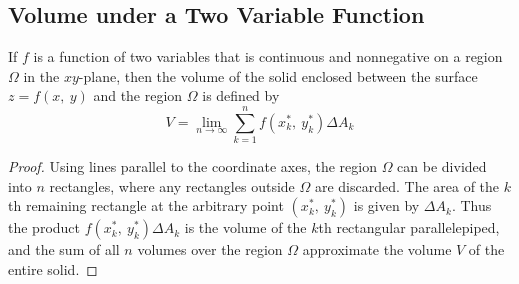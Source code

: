 \documentclass{article}
\begin{document}
\subsection{Volume under a Two Variable Function}
\begin{definition}
    If $f$ is a function of two variables that is continuous and nonnegative
    on a region $\Omega$ in the $xy$-plane, then the volume of the solid
    enclosed between the surface $z=f(x,\: y)$ and the region $\Omega$ is
    defined by
    \begin{equation}\label{eq:volume_under_2d_function}
        V = \lim_{n \to \infty} \sum_{k = 1}^n f(x_k^\ast,\: y_k^\ast) \Delta A_k
    \end{equation}
\end{definition}
\begin{proof}
    Using lines parallel to the coordinate axes, the region $\Omega$ can be divided
    into $n$ rectangles, where any rectangles outside $\Omega$ are discarded.
    The area of the $k$th remaining rectangle at the arbitrary point $(x_k^\ast,\: y_k^\ast)$
    is given by $\Delta A_k$. Thus the product $f(x_k^\ast,\: y_k^\ast)\Delta A_k$ is the
    volume of the $k$th rectangular parallelepiped, and the sum of all $n$ volumes over
    the region $\Omega$ approximate the volume $V$ of the entire solid.
\end{proof}
\end{document}
